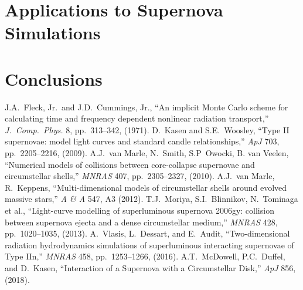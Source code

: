 \documentclass[]{article}
\begin{document}
\section{Applications to Supernova Simulations}


\section{Conclusions}


\begin{thebibliography}{99}
 J.A.\ Fleck, Jr.\ and J.D.\ Cummings, Jr., ``An implicit Monte Carlo scheme for calculating time and frequency dependent nonlinear radiation transport,''
  {\em J.\ Comp.\ Phys.} 8, pp.\ 313--342, (1971).
 D.\ Kasen and S.E.\ Woosley, ``Type II supernovae: model light curves and standard candle relationships,''
  {\em ApJ} 703, pp.\ 2205--2216, (2009).
 A.J.\ van Marle, N.\ Smith, S.P\ Owocki, B. van Veelen, ``Numerical models of collisions between core-collapse supernovae and circumstellar shells,''
  {\em MNRAS} 407, pp.\ 2305--2327, (2010).
 A.J.\ van Marle, R.\ Keppens, ``Multi-dimensional models of circumstellar shells around evolved massive stars,''
  {\em A \& A} 547, A3 (2012).
 T.J.\ Moriya, S.I.\ Blinnikov, N.\ Tominaga et al., ``Light-curve modelling of superluminous supernova 2006gy: collision between supernova ejecta and a dense circumstellar medium,''
  {\em MNRAS} 428, pp.\ 1020--1035, (2013).
 A.\ Vlasis, L.\ Dessart, and E.\ Audit, ``Two-dimensional radiation hydrodynamics simulations of superluminous interacting supernovae of Type IIn,''
  {\em MNRAS} 458, pp.\ 1253--1266, (2016).
 A.T.\ McDowell, P.C.\ Duffel, and D.\ Kasen, ``Interaction of a Supernova with a Circumstellar Disk,''
  {\em ApJ} 856, (2018).
\end{thebibliography}
\end{document}
